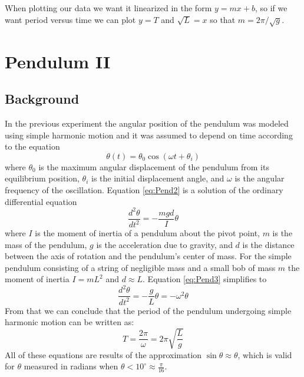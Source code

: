 When plotting our data we want it linearized in the form $y = mx+b$, so if we want period versus time we can plot $y = T$ and $\sqrt{L} = x$ so that $m = 2\pi/\sqrt{g}$.






\chapter{Pendulum II}


\section{Background}

In the previous experiment the angular position of the pendulum was modeled using simple harmonic motion and it was assumed to depend on time according to the equation \begin{equation}\label{eq:Pend2}
    \theta(t) = \theta_0\cos(\omega t+\theta_i)
\end{equation}
where $\theta_0$ is the maximum angular displacement of the pendulum from its equilibrium position, $\theta_i$ is the initial displacement angle, and $\omega$ is the angular frequency of the oscillation. Equation \ref{eq:Pend2} is a solution of the ordinary differential equation \begin{equation}\label{eq:Pend3}
    \frac{d^2\theta}{dt^2} = -\frac{mgd}{I}\theta
\end{equation}
where $I$ is the moment of inertia of a pendulum about the pivot point, $m$ is the mass of the pendulum, $g$ is the acceleration due to gravity, and $d$ is the distance between the axis of rotation and the pendulum's center of mass. For the simple pendulum consisting of a string of negligible mass and a small bob of mass $m$ the moment of inertia $I = mL^2$ and $d \approx L$. Equation \ref{eq:Pend3} simplifies to \begin{equation}\label{eq:Pend4}
    \frac{d^2\theta}{dt^2} = -\frac{g}{L}\theta = -\omega^2\theta
\end{equation}
From that we can conclude that the period of the pendulum undergoing simple harmonic motion can be written as: \begin{equation}\label{eq:Pend5}
    T = \frac{2\pi}{\omega} = 2\pi\sqrt{\frac{L}{g}}
\end{equation}
All of these equations are results of the approximation $\sin\theta \approx \theta$, which is valid for $\theta$ measured in radians when $\theta < 10^{\circ} \approx \frac{\pi}{16}$.

